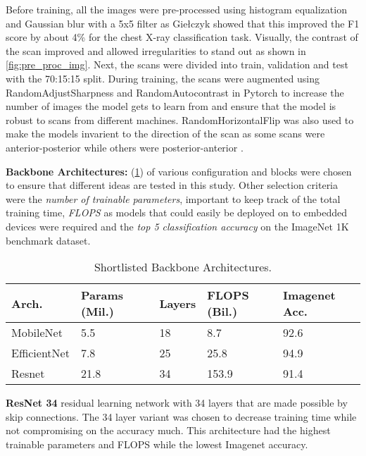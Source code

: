 \documentclass[10pt,twocolumn,letterpaper]{article}
\begin{document}
Before training, all the images were pre-processed using histogram equalization and Gaussian blur 
with a 5x5 filter as Giełczyk \etal \cite{gielczyk2022pre} showed that this improved the 
F1 score by about 4\% for the chest X-ray classification task. Visually, the contrast of the scan improved 
and allowed irregularities to stand out as shown in \cref{fig:pre_proc_img}. Next, the 
scans were divided into train, validation and test with the 70:15:15 split. 
During training, the scans were augmented using RandomAdjustSharpness and 
RandomAutocontrast in Pytorch \cite{transforms} to increase the number of images the 
model gets to learn from and ensure that the model is robust to scans from different machines.
RandomHorizontalFlip was also used to make the models invarient to the direction of the scan as 
some scans were anterior-posterior while others were posterior-anterior \cite{botev2022regularising}.

\textbf{Backbone Architectures:} (\cref{tab:selArch}) of various configuration and blocks were chosen 
to ensure that different ideas are tested in this study. 
Other selection criteria were the \textit{number of trainable parameters}, important to keep track of 
the total training time, \textit{FLOPS} as models that could easily be 
deployed on to embedded devices were required and the \textit{top 5 classification accuracy} on the ImageNet 
1K benchmark dataset.

\begin{table}
  \centering
  \begin{tabular}{p{1.7cm}|p{1cm}|p{1cm}|p{1cm}|p{1cm}}
  \toprule
  Arch. & Params (Mil.) & Layers & FLOPS (Bil.) & Imagenet Acc.\\
  \midrule
  MobileNet & 5.5 & 18 & 8.7 & 92.6\\
  \midrule
  EfficientNet & 7.8 & 25 & 25.8 & 94.9\\
  \midrule
  Resnet & 21.8 & 34 & 153.9 & 91.4\\
  \bottomrule
  \end{tabular}
  \caption{Shortlisted Backbone Architectures.}
  \label{tab:selArch}
\end{table}

\textbf{ResNet 34} residual learning network with 34 layers that are made possible by skip 
connections. The 34 layer variant was chosen to decrease training time while not compromising on 
the accuracy much. This architecture had the highest trainable parameters and FLOPS while the lowest 
Imagenet accuracy.
\cite{he2016deep}
\end{document}

